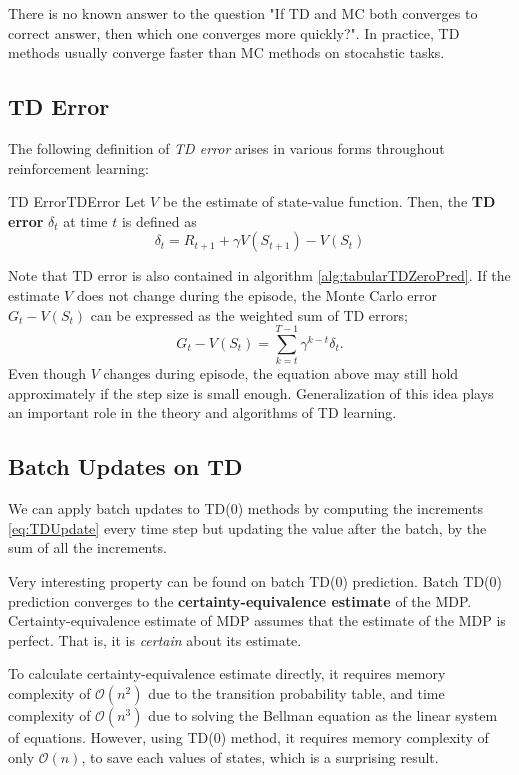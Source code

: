 \documentclass[../../main.tex]{subfiles}
\begin{document}
            There is no known answer to the question "If TD and MC both converges to correct answer, then which one converges more quickly?".
            In practice, TD methods usually converge faster than MC methods on stocahstic tasks.

    \subsection{TD Error}
        The following definition of \emph{TD error} arises in various forms throughout reinforcement learning:
        \begin{defn}{TD Error}{TDError}
            Let $V$ be the estimate of state-value function. Then, the \textbf{TD error} $\delta_t$ at time $t$ is defined as
            \begin{equation}
                \delta_t = R_{t+1} + \gamma V(S_{t+1}) - V(S_t)
            \end{equation}
        \end{defn}
        Note that TD error is also contained in algorithm \ref{alg:tabularTDZeroPred}. If the estimate $V$ does not change during the episode,
        the Monte Carlo error $G_t - V(S_t)$ can be expressed as the weighted sum of TD errors;
        \begin{equation}
            G_t - V(S_t) = \sum_{k=t}^{T-1} \gamma^{k-t}\delta_t.
        \end{equation}
        Even though $V$ changes during episode, the equation above may still hold approximately if the step size is small enough.
        Generalization of this idea plays an important role in the theory and algorithms of TD learning. 

    \subsection{Batch Updates on TD}
        We can apply batch updates to TD(0) methods by computing the increments \ref{eq:TDUpdate} every time step but updating the value
        after the batch, by the sum of all the increments.

        Very interesting property can be found on batch TD(0) prediction. Batch TD(0) prediction converges to the \textbf{certainty-equivalence estimate}
        of the MDP. Certainty-equivalence estimate of MDP assumes that the estimate of the MDP is perfect. That is, it is \emph{certain} about its estimate.

        To calculate certainty-equivalence estimate directly, it requires memory complexity of $\mathcal{O}(n^2)$ due to the transition probability table,
        and time complexity of $\mathcal{O}(n^3)$ due to solving the Bellman equation as the linear system of equations.
        However, using TD(0) method, it requires memory complexity of only $\mathcal{O}(n)$, to save each values of states, which is a surprising result.
\end{document}
